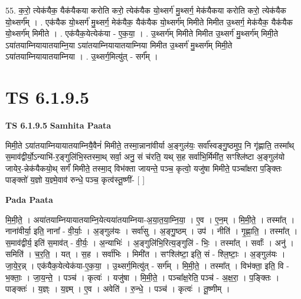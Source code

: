 \documentclass[17pt]{extarticle}
\begin{document}
55. क॒रो॒ त्येक॑यैक॒ यैक॑यैकया करोति करो॒ त्येक॑यैक यो॒थ्सर्ग॑ मु॒थ्सर्ग॒ मेक॑यैकया करोति करो॒ त्येक॑यैक यो॒थ्सर्ग᳚म् । . एक॑यैक यो॒थ्सर्ग॑ मु॒थ्सर्ग॒ मेक॑यैक॒ यैक॑यैक यो॒थ्सर्ग॑म् मिमीते मिमीत उ॒थ्सर्ग॒ मेक॑यैक॒ यैक॑यैक यो॒थ्सर्ग॑म् मिमीते । . एक॑यैक॒येत्येक॑या - ए॒क॒या॒ । . उ॒थ्सर्ग॑म् मिमीते मिमीत उ॒थ्सर्ग॑ मु॒थ्सर्ग॑म् मिमी॒ते ऽया॑तयाम्नियायातयाम्नि॒या ऽया॑तयाम्नियायातयाम्निया मिमीत उ॒थ्सर्ग॑ मु॒थ्सर्ग॑म् मिमी॒ते ऽया॑तयाम्नियायातयाम्निया । . उ॒थ्सर्ग॒मित्यु॑त् - सर्ग᳚म् । \newline
\pagebreak
{}

\section{ TS 6.1.9.5 }

\textbf{TS 6.1.9.5 } \newline
\textbf{Samhita Paata} \newline

मिमी॒ते ऽया॑तयाम्नियायातयाम्नियै॒वैनं॑ मिमीते॒ तस्मा॒न्नाना॑वीर्या अ॒ङ्गुल॑यः॒ सर्वा᳚स्वङ्गु॒ष्ठमुप॒ नि गृ॑ह्णाति॒ तस्मा᳚थ् स॒माव॑द्वीर्यो॒ऽन्याभि॑-र॒ङ्गुलि॑भि॒स्तस्मा॒थ् सर्वा॒ अनु॒ सं च॑रति॒ यथ् स॒ह सर्वा॑भि॒र्मिमी॑त॒ सꣳश्लि॑ष्टा अ॒ङ्गुल॑यो जायेर॒-न्नेक॑यैकयो॒थ् सर्गं॑ मिमीते॒ तस्मा॒द् विभ॑क्ता जायन्ते॒ पञ्च॒ कृत्वो॒ यजु॑षा मिमीते॒ पञ्चा᳚क्षरा प॒ङ्क्तिः पाङ्क्तो॑ य॒ज्ञो य॒ज्ञ्मे॒वाव॑ रुन्धे॒ पञ्च॒ कृत्व॑स्तू॒ष्णीं- [  ] \newline

\textbf{Pada Paata} \newline

मि॒मी॒ते॒ । अया॑तयाम्नियायातयाम्नि॒येत्यया॑तयाम्निया-अ॒या॒त॒या॒म्नि॒या॒ । ए॒व । ए॒न॒म् । मि॒मी॒ते॒ । तस्मा᳚त् । नाना॑वीर्या॒ इति॒ नाना᳚ - वी॒र्याः॒ । अ॒ङ्गुल॑यः । सर्वा॑सु । अ॒ङ्गु॒ष्ठम् । उप॑ । नीति॑ । गृ॒ह्णा॒ति॒ । तस्मा᳚त् । स॒माव॑द्वीर्य॒ इति॑ स॒माव॑त् - वी॒र्यः॒ । अ॒न्याभिः॑ । अ॒ङ्गुलि॑भि॒रित्य॒ङ्गुलि॑ - भिः॒ । तस्मा᳚त् । सर्वाः᳚ । अनु॑ । समिति॑ । च॒र॒ति॒ । यत् । स॒ह । सर्वा॑भिः । मिमी॑त । सꣳश्लि॑ष्टा॒ इति॒ सं - श्लि॒ष्टाः॒ । अ॒ङ्गुल॑यः । जा॒ये॒र॒न्न् । एक॑यैक॒येत्येक॑या-ए॒क॒या॒ । उ॒थ्सर्ग॒मित्यु॑त् - सर्ग᳚म् । मि॒मी॒ते॒ । तस्मा᳚त् । विभ॑क्ता॒ इति॒ वि - भ॒क्ताः॒ । जा॒य॒न्ते॒ । पञ्च॑ । कृत्वः॑ । यजु॑षा । मि॒मी॒ते॒ । पञ्चा᳚क्ष॒रेति॒ पञ्च॑ - अ॒क्ष॒रा॒ । प॒ङ्क्तिः । पाङ्क्तः॑ । य॒ज्ञ्ः । य॒ज्ञ्म् । ए॒व । अवेति॑ । रु॒न्धे॒ । पञ्च॑ । कृत्वः॑ । तू॒ष्णीम् ।  \newline
\end{document}
